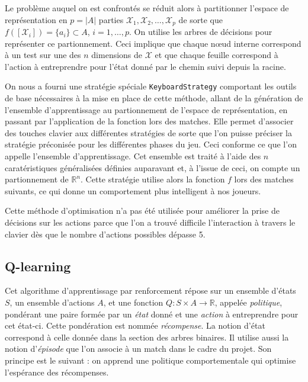 \documentclass[12pt,a4paper]{article}
\begin{document}
Le probl\`eme auquel on est confront\'es se r\'eduit alors \`a 
partitionner l'espace de repr\'esentation en $p=|A|$ parties 
$\mathcal{X}_1,\mathcal{X}_2,\dotsc,\mathcal{X}_p$ de sorte que 
$f([\mathcal{X}_i]) = \{ a_i \} \subset A$, $i = 1,\dotsc,p$. On utilise les 
arbres de d\'ecisions pour repr\'esenter ce partionnement. Ceci 
implique que chaque n\oe ud interne correspond \`a un test sur une des $n$ 
dimensions de $\mathcal{X}$ et que chaque feuille correspond \`a l'action \`a 
entreprendre pour l'\'etat donn\'e par le chemin suivi depuis la racine.

On nous a fourni une strat\'egie sp\'eciale \texttt{KeyboardStrategy} 
comportant les outils de base n\'ecessaires \`a la mise en place de cette 
m\'ethode, allant de la g\'en\'eration de l'ensemble d'apprentissage au 
partionnement de l'espace de repr\'esentation, en passant par l'application de 
la fonction lors des matches. 
Elle permet d'associer des touches clavier aux diff\'erentes strat\'egies de 
sorte que l'on puisse pr\'eciser la strat\'egie pr\'econis\'ee pour les 
diff\'erentes phases du jeu. Ceci conforme ce que l'on appelle l'ensemble 
d'apprentissage. Cet ensemble est trait\'e \`a l'aide des $n$ carat\'eristiques 
g\'en\'eralis\'ees d\'efinies auparavant et, \`a l'issue de ceci, on compte 
un partionnement de $\mathbb{R}^n$. Cette strat\'egie utilise alors la fonction 
$f$ lors des matches suivants, ce qui donne un comportement plus intelligent 
\`a nos joueurs.

Cette m\'ethode d'optimisation n'a pas \'et\'e utilis\'ee pour am\'eliorer la 
prise de d\'ecisions sur les actions parce que l'on a trouv\'e difficile 
l'interaction \`a travers le clavier d\`es que le nombre d'actions 
possibles d\'epasse 5.

\subsection*{Q-learning}
Cet algorithme d'apprentissage par renforcement r\'epose sur un ensemble 
d'\'etats $S$, un ensemble d'actions $A$, et une fonction $Q: S \times A \to 
\mathbb{R}$, appel\'ee {\itshape politique}, pond\'erant une paire form\'ee 
par un {\itshape \'etat} donn\'e et une {\itshape action} \`a entreprendre pour 
cet \'etat-ci. Cette pond\'eration est nomm\'ee {\itshape r\'ecompense}. La 
notion d'\'etat correspond \`a celle donn\'ee dans la section des arbres 
binaires. Il utilise aussi la notion d'{\itshape \'episode} que l'on associe 
\`a un match dans le cadre du projet. Son principe est le suivant : on apprend 
une politique comportementale qui optimise l'esp\'erance des r\'ecompenses.
\end{document}

